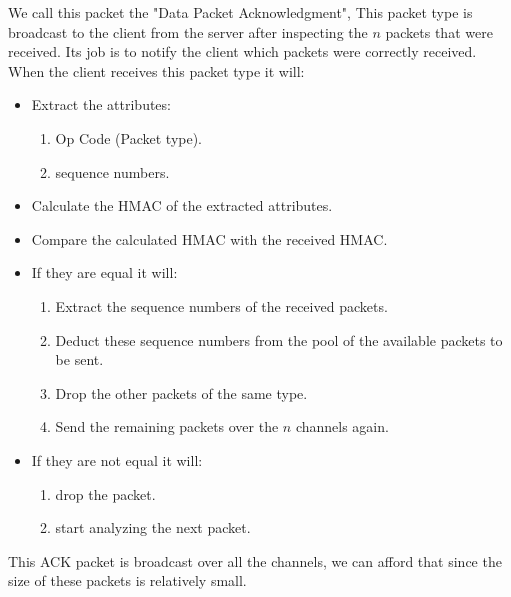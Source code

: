 \documentclass[main.tex]{subfiles}
\begin{document}
We call this packet the "Data Packet Acknowledgment", This packet type is broadcast to the client from the server after inspecting the $n$ packets that were received. Its job is to notify the client which packets were correctly received. When the client receives this packet type it will:
\begin{itemize}
\item Extract the attributes:
\begin{enumerate}
\item Op Code (Packet type).
\item sequence numbers.
\end{enumerate}
\item Calculate the HMAC of the extracted attributes.
\item Compare the calculated HMAC with the received HMAC.
\item If they are equal it will:
\begin{enumerate}
\item Extract the sequence numbers of the received packets.
\item Deduct these sequence numbers from the pool of the available packets to be sent.
\item Drop the other packets of the same type.
\item Send the remaining packets over the $n$ channels again.
\end{enumerate}
\item If they are not equal it will:
\begin{enumerate}
\item drop the packet.
\item start analyzing the next packet.
\end{enumerate}
\end{itemize} 
This ACK packet is broadcast over all the channels, we can afford that since the size of these packets is relatively small.
\end{document}
